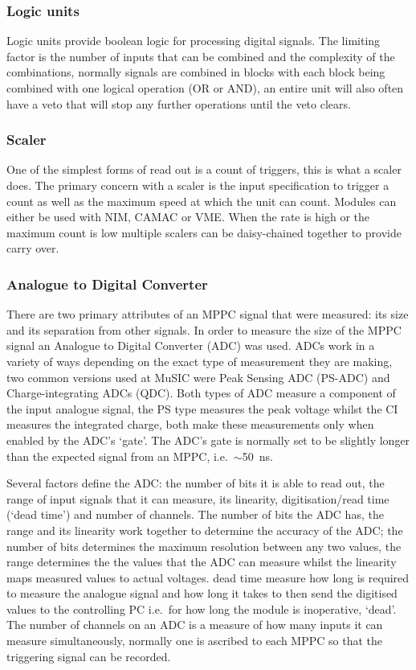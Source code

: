 \subsubsection{Logic units} %
\label{ssub:logic_units}
Logic units provide boolean logic for processing digital signals. The limiting factor is the number of inputs that can be combined and the complexity of the combinations, normally signals are combined in blocks with each block being combined with one logical operation (OR or AND), an entire unit will also often have a veto that will stop any further operations until the veto clears.

\subsubsection{Scaler} %
\label{ssub:scaler}
One of the simplest forms of read out is a count of triggers, this is what a scaler does. The primary concern with a scaler is the input specification to trigger a count as well as the maximum speed at which the unit can count. Modules can either be used with NIM, CAMAC or VME. When the rate is high or the maximum count is low multiple scalers can be daisy-chained together to provide carry over. 
\subsubsection{Analogue to Digital Converter} %
\label{ssub:analogue_to_digital_converter}
There are two primary attributes of an MPPC signal that were measured: its size and its separation from other signals. In order to measure the size of the MPPC signal an Analogue to Digital Converter (ADC) was used. ADCs work in a variety of ways depending on the exact type of measurement they are making, two common versions used at MuSIC were Peak Sensing ADC (PS-ADC) and Charge-integrating ADCs (QDC). Both types of ADC measure a component of the input analogue signal, the PS type measures the peak voltage whilst the CI measures the integrated charge, both make these measurements only when enabled by the ADC's `gate'. The ADC's gate is normally set to be slightly longer than the expected signal from an MPPC, i.e.\ \( \sim \)50~ns. 

Several factors define the ADC: the number of bits it is able to read out, the range of input signals that it can measure, its linearity, digitisation/read time (`dead time') and number of channels. The number of bits the ADC has, the range and its linearity work together to determine the accuracy of the ADC; the number of bits determines the maximum resolution between any two values, the range determines the the values that the ADC can measure whilst the linearity maps measured values to actual voltages. dead time measure how long is required to measure the analogue signal and how long it takes to then send the digitised values to the controlling PC i.e.\ for how long the module is inoperative, `dead'. The number of channels on an ADC is a measure of how many inputs it can measure simultaneously, normally one is ascribed to each MPPC so that the triggering signal can be recorded.


